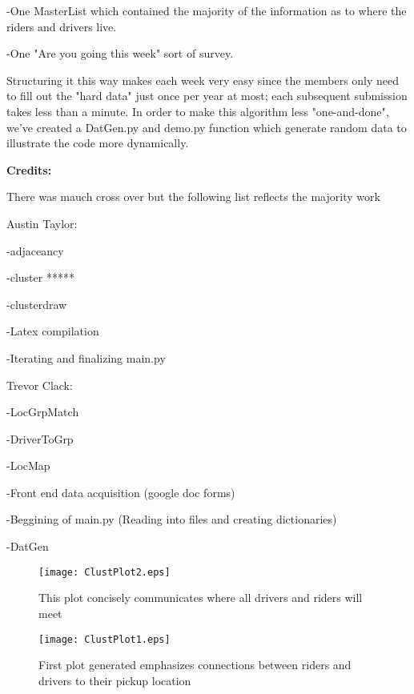 \documentclass[11pt]{article}
\begin{document}
	-One MasterList which contained the majority of the information as to where
	the riders and drivers live.

	-One "Are you going this week" sort of survey.

\hfill \break
Structuring it this way makes each week very easy since the members only need
to fill out the "hard data" just once per year at most; each subsequent
submission takes less than a minute. In order to make this algorithm less "one-and-done", we've created a 
DatGen.py and demo.py function which generate random data to illustrate the
code more dynamically.





\hfill \break
\hfill \break
\hfill \break
\hfill \break
\hfill \break
\hfill \break
\hfill \break
\hfill \break
\hfill \break
\hfill \break
\hfill \break
\textbf{Credits:}

\hfill \break
There was mauch cross over but the following list reflects the majority work

\hfill \break
Austin Taylor:
\hfill \break


		-adjaceancy

		-cluster *****

		-clusterdraw

-Latex compilation

-Iterating and finalizing main.py

\hfill \break
Trevor Clack:
\hfill \break

		-LocGrpMatch

		-DriverToGrp

		-LocMap

-Front end data acquisition (google doc forms)

-Beggining of main.py (Reading into files and creating dictionaries)

-DatGen

\hfill \break
\hfill \break
\hfill \break
\hfill \break
\hfill \break
\hfill \break
\begin{figure}[h]
\begin{center}
\texttt{[image: ClustPlot2.eps]}
\vspace{-18bp}
\end{center}
\caption[]{\label{fig:Gaussian}\small
This plot concisely communicates where all drivers and riders will meet
}
\end{figure}



\begin{figure}[h]
\begin{center}
\texttt{[image: ClustPlot1.eps]}
\vspace{-18bp}
\end{center}
\caption[]{\label{fig:Gaussian}\small
First plot generated emphasizes connections between riders and drivers to their 
pickup location
}
\end{figure}

\end{document}
